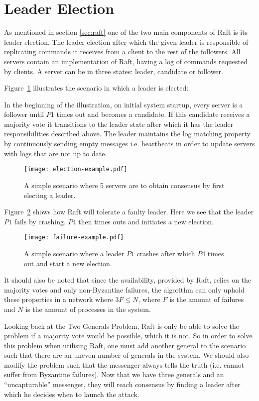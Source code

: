 \section{Leader Election} %
\label{sec:leader_election}
As mentioned in section \ref{sec:raft} one of the two main components of Raft is its leader election. The leader election after which the given leader is responsible of replicating commands it receives from a client to the rest of the followers. All servers contain an implementation of Raft, having a log of commands requested by clients. A server can be in three states: leader, candidate or follower.

Figure~\ref{fig:election_example} illustrates the scenario in which a leader is elected:

In the beginning of the illustration, on initial system startup, every server is a follower until $P1$ times out and becomes a candidate. If this candidate receives a majority vote it transitions to the leader state after which it has the leader responsibilities described above. The leader maintains the log matching property by continuously sending empty messages i.e. heartbeats in order to update servers with logs that are not up to date.

\begin{figure}[ht!]
\centering
\texttt{[image: election-example.pdf]}
\caption{A simple scenario where 5 servers are to obtain consensus by first electing a leader.}
\label{fig:election_example}
\end{figure}

Figure~\ref{fig:failure_example} shows how Raft will tolerate a faulty leader. Here we see that the leader $P1$ fails by crashing. $P4$ then times outs and initiates a new election.

\begin{figure}[ht!]
\centering
\texttt{[image: failure-example.pdf]}
\caption{A simple scenario where a leader $P1$ crashes after which $P4$ times out and start a new election.}
\label{fig:failure_example}
\end{figure}

It should also be noted that since the availability, provided by Raft, relies on the majority votes and only non-Byzantine failures, the algorithm can only uphold these properties in a network where $3F \leq N$, where $F$ is the amount of failures and $N$ is the amount of processes in the system.~\cite{Fischer}

Looking back at the Two Generals Problem, Raft is only be able to solve the problem if a majority vote would be possible, which it is not. So in order to solve this problem when utilising Raft, one must add another general to the scenario such that there are an uneven number of generals in the system. We should also modify the problem such that the messenger always tells the truth (i.e. cannot suffer from Byzantine failures). Now that we have three generals and an ``uncapturable'' messenger, they will reach consensus by finding a leader after which he decides when to launch the attack.

